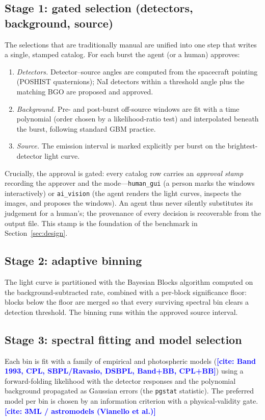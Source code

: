 \documentclass[twocolumn]{aastex631}
\newcommand{\TODOcite}[1]{\textbf{\textcolor{blue}{[cite: #1]}}}
\begin{document}
\subsection{Stage 1: gated selection (detectors, background, source)}
\label{sec:stage1}
The selections that are traditionally manual are unified into one step that writes
a single, stamped catalog. For each burst the agent (or a human) approves:
\begin{enumerate}
\item \emph{Detectors.} Detector--source angles are computed from the spacecraft
  pointing (POSHIST quaternions); NaI detectors within a threshold angle plus the
  matching BGO are proposed and approved.
\item \emph{Background.} Pre- and post-burst off-source windows are fit with a
  time polynomial (order chosen by a likelihood-ratio test) and interpolated
  beneath the burst, following standard GBM practice.
\item \emph{Source.} The emission interval is marked explicitly per burst on the
  brightest-detector light curve.
\end{enumerate}
Crucially, the approval is gated: every catalog row carries an \emph{approval
stamp} recording the approver and the mode---\texttt{human\_gui} (a person marks
the windows interactively) or \texttt{ai\_vision} (the agent renders the light
curves, inspects the images, and proposes the windows). An agent thus never
silently substitutes its judgement for a human's; the provenance of every decision
is recoverable from the output file. This stamp is the foundation of the benchmark
in Section~\ref{sec:design}.

\subsection{Stage 2: adaptive binning}
The light curve is partitioned with the Bayesian Blocks algorithm
\citep{Scargle2013} computed on the background-subtracted rate, combined with a
per-block significance floor: blocks below the floor are merged so that every
surviving spectral bin clears a detection threshold. The binning runs within the
approved source interval.

\subsection{Stage 3: spectral fitting and model selection}
Each bin is fit with a family of empirical and photospheric models
(\TODOcite{Band 1993, CPL, SBPL/Ravasio, DSBPL, Band+BB, CPL+BB}) using a
forward-folding likelihood with the detector responses and the polynomial
background propagated as Gaussian errors (the \texttt{pgstat} statistic). The preferred model per bin is chosen by an
information criterion with a physical-validity gate. \TODOcite{3ML / astromodels
(Vianello et al.)}
\end{document}
